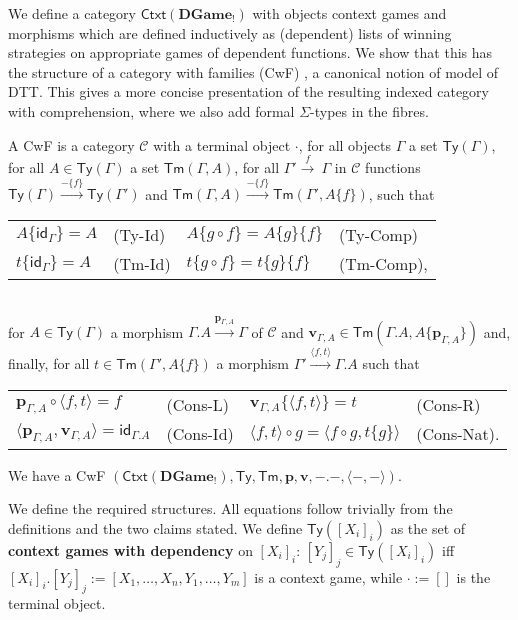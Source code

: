 \documentclass[runningheads,a4paper]{llncs}
\newcommand{\ra}[1]{\stackrel{#1}{\longrightarrow}}
\newcommand{\DGame}{\mathbf{DGame}}
\renewcommand{\emph}[1]{\textbf{#1}}
\begin{document}
We define a category $\mathsf{Ctxt}(\DGame_!)$ with objects context games and morphisms which are defined inductively as (dependent) lists of winning strategies on appropriate games of dependent functions. We show that this has the structure of a category with families (CwF) \cite{hofmann1997syntax}, a canonical notion of model of \textsf{DTT}. This gives a more concise presentation of the resulting indexed category with comprehension, where we also add formal $\Sigma$-types in the fibres.

\begin{definition}[CwF] A CwF is a category $\mathcal{C}$ with a terminal object $\cdot$, for all objects $\Gamma$ a set $\mathsf{Ty}(\Gamma)$, for all $A\in \mathsf{Ty}(\Gamma)$ a set $\mathsf{Tm}(\Gamma,A)$, for all $\Gamma'\ra{f}~\Gamma$ in $\mathcal{C}$ functions $\mathsf{Ty}(\Gamma)\ra{-\{f\}}\mathsf{Ty}(\Gamma')$ and $\mathsf{Tm}(\Gamma,A)\ra{-\{f\}}\mathsf{Tm}(\Gamma',A\{f\})$, such that
\begin{tabular}{llll}
$A\{\mathsf{id}_\Gamma\}=A$ & (Ty-Id)\hspace{60pt} & $A\{g\circ f\}=A\{g\}\{f\}$\hspace{23pt} & (Ty-Comp)\\
$t\{\mathsf{id}_\Gamma\}=A$ \hspace{23pt} & (Tm-Id)& $t\{g\circ f\}=t\{g\}\{f\}$ & (Tm-Comp),
\end{tabular}\\
for $A\in\mathsf{Ty}(\Gamma)$ a morphism $\Gamma.A\ra{\mathbf{p}_{\Gamma,A}}\Gamma$ of $\mathcal{C}$ and $\mathbf{v}_{\Gamma,A}\in\mathsf{Tm}(\Gamma.A,A\{\mathbf{p}_{\Gamma,A}\})$ and, finally, for all $t\in \mathsf{Tm}(\Gamma',A\{f\})$ a morphism $\Gamma'\ra{\langle f,t\rangle}\Gamma.A$ such that\linebreak
\begin{tabular}{llll}
$\mathbf{p}_{\Gamma,A}\circ \langle f,t\rangle=f$ & (Cons-L)\hspace{35pt} & 
$\mathbf{v}_{\Gamma,A}\{\langle f,t\rangle\}=t $&(Cons-R)  \\
$\langle \mathbf{p}_{\Gamma,A},\mathbf{v}_{\Gamma,A}\rangle=\mathsf{id}_{\Gamma.A}$ \hspace{7pt} &(Cons-Id) &
$\langle f,t\rangle \circ g=\langle f\circ g,t\{g\}\rangle$ \hspace{7pt} & (Cons-Nat).
\end{tabular}

\end{definition}

\begin{theorem}We have a CwF $(\mathsf{Ctxt}(\DGame_{!}),\mathsf{Ty},\mathsf{Tm},\mathbf{p},\mathbf{v}, -.-, \langle - ,-\rangle)$.
\end{theorem}We define the required structures. All equations follow trivially from the definitions and the two claims stated.
We define $\mathsf{Ty}([X_i]_i)$ as the set of \emph{context games with dependency} on $[X_i]_i$: $[Y_j]_j\in\mathsf{Ty}([X_i]_i)$ iff $[X_i]_i.[Y_j]_j:=[X_1,\ldots,X_n,Y_1,\ldots,Y_m]$ is a context game, while $\cdot:=[]$ is the terminal object.
\end{document}
